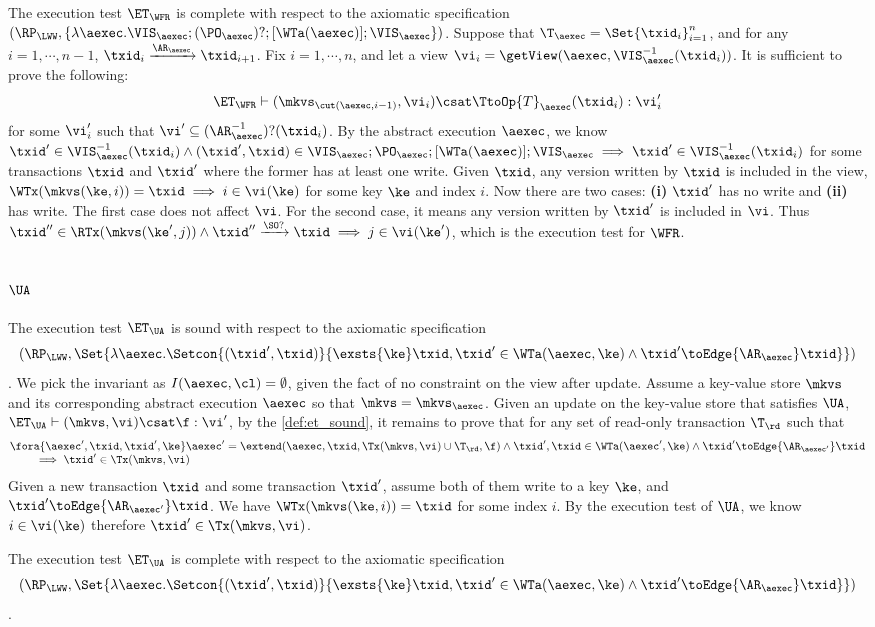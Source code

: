 The execution test $\ET_\WFR$ is complete with respect to the axiomatic specification 
\( (\RP_{\LWW}, \{\lambda \aexec. \VIS_\aexec ; (\PO_{\aexec})? ; [\WTa(\aexec)] ; \VIS_{\aexec} \})\).
Suppose that $\T_{\aexec} = \Set{\txid_{i}}_{i=1}^{n}$, and for any $i=1,\cdots, n-1$,
$\txid_{i} \xrightarrow{\AR_{\aexec}} \txid_{i+1}$.
Fix $i=1,\cdots,n$, and let a view $\vi_{i} = \getView(\aexec, \VIS^{-1}_{\aexec}(\txid_{i}))$.
It is sufficient to prove the following:
\[
    \ET_\WFR \vdash ( \mkvs_{\cut(\aexec, i-1)}, \vi_i ) \csat \TtoOp{T}_{\aexec}(\txid_{i}) : \vi'_{i}
\]
for some \( \vi'_i \) such that \( \vi' \subseteq (\AR^{-1}_\aexec)?(\txid_i) \).
By the abstract execution \( \aexec \), 
we know \( \txid' \in \VIS^{-1}_{\aexec}(\txid_{i}) \land (\txid', \txid) \in \VIS_\aexec ; \PO_{\aexec} ; [\WTa(\aexec)] ; \VIS_{\aexec}  \implies \txid' \in \VIS^{-1}_{\aexec}(\txid_{i}) \) 
for some transactions \( \txid \) and \( \txid' \) where the former has at least one write. 
Given \( \txid \), any version written by \( \txid \) is included in the view, 
\ie \(  \WTx(\mkvs(\ke, i) ) = \txid \implies i \in \vi(\ke) \) for some key \( \ke \) and index \( i \).
Now there are two cases: \textbf{(i)} \( \txid' \) has no write and \textbf{(ii)} has write.
The first case does not affect \( \vi \).
For the second case, it means any version written by \( \txid' \) is included in \( \vi \).
Thus \( \txid'' \in \RTx( \mkvs(\ke', j)) \land \txid'' \xrightarrow{\SO?} \txid \implies j \in \vi(\ke') \), 
which is the execution test for \( \WFR \).

\subsection{\( \UA \)}

The execution test $\ET_\UA$ is sound with respect to the axiomatic specification 
\[ 
    (\RP_{\LWW}, \Set{\lambda \aexec. \Setcon{(\txid', \txid)}{\exsts{\ke} \txid, \txid' \in \WTa(\aexec, \ke) \land \txid' \toEdge{\AR_\aexec} \txid } })
\].
We pick the invariant as \( I( \aexec, \cl ) = \emptyset \), given the fact of no constraint on the view after update.
Assume a key-value store \( \mkvs \) and its corresponding abstract execution \( \aexec \) so that \( \mkvs = \mkvs_\aexec \).
Given an update on the key-value store that satisfies \( \UA \), \ie \(\ET_\UA \vdash (\mkvs, \vi) \csat \f : \vi' \),
by the \cref{def:et_sound}, it remains to prove that for any set of read-only transaction \( \T_{\rd} \) such that
\[
    \begin{array}{@{}l@{}}
        \fora{ \aexec', \txid, \txid', \ke } 
        \aexec' = \extend(\aexec, \txid, \Tx(\mkvs, \vi) \cup \T_\rd, \f ) 
        \land \txid', \txid \in \WTa(\aexec', \ke) \land  \txid' \toEdge{\AR_{\aexec'}} \txid  \\
        \qquad {} \implies \txid' \in \Tx(\mkvs, \vi)
    \end{array}
\]
Given a new transaction \( \txid \) and some transaction \( \txid' \),
assume both of them write to a key \( \ke \), and \( \txid' \toEdge{\AR_{\aexec'}} \txid \).
We have \( \WTx(\mkvs(\ke, i)) = \txid \) for some index \( i \).
By the execution test of \( \UA \), we know \( i \in \vi(\ke) \) therefore \( \txid' \in \Tx(\mkvs, \vi) \).


The execution test $\ET_\UA$ is complete with respect to the axiomatic specification 
\[ 
    (\RP_{\LWW}, \Set{\lambda \aexec. \Setcon{(\txid', \txid)}{\exsts{\ke} \txid, \txid' \in \WTa(\aexec, \ke) \land \txid' \toEdge{\AR_\aexec} \txid } })
\].

